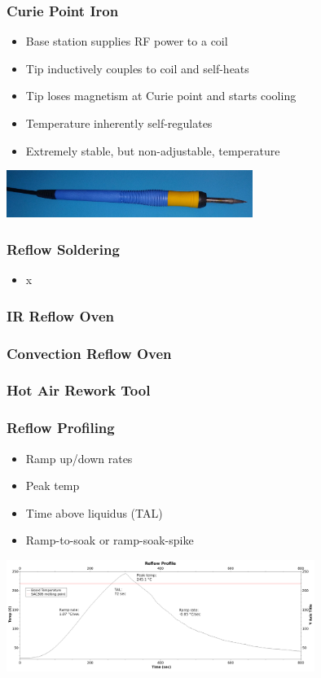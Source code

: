 \documentclass{beamer}
\begin{document}
\begin{frame}
\frametitle{Curie Point Iron}
\begin{itemize}
\item Base station supplies RF power to a coil
\item Tip inductively couples to coil and self-heats
\item Tip loses magnetism at Curie point and starts cooling
\item Temperature inherently self-regulates
\item Extremely stable, but non-adjustable, temperature
\end{itemize}
\begin{center}
\includegraphics[width=8cm,keepaspectratio]{curie-iron.jpg}
\end{center}
\end{frame}

\begin{frame}
\frametitle{Reflow Soldering}
\begin{itemize}
\item x
\end{itemize}
\end{frame}

\begin{frame}
\frametitle{IR Reflow Oven}

\end{frame}

\begin{frame}
\frametitle{Convection Reflow Oven}

\end{frame}

\begin{frame}
\frametitle{Hot Air Rework Tool}

\end{frame}

\begin{frame}
\frametitle{Reflow Profiling}
\begin{itemize}
\item Ramp up/down rates
\item Peak temp
\item Time above liquidus (TAL)
\item Ramp-to-soak or ramp-soak-spike
\end{itemize}
\begin{center}
\includegraphics[width=10cm,keepaspectratio]{reflow-profile.png}
\end{center}
\end{frame}
\end{document}
